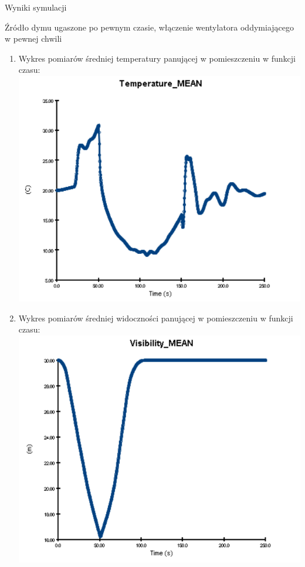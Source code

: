 \documentclass[a4paper, 12pt]{scrartcl}
\begin{document}
\begin{section}{Wyniki symulacji}
		\begin{subsection}{Źródło dymu ugaszone po pewnym czasie, włączenie wentylatora oddymiającego w pewnej chwili}
			\begin{enumerate}[i]
				\item Wykres pomiarów średniej temperatury panującej w pomieszczeniu w funkcji czasu: \\
				\includegraphics{../H24_Ventilation/temperature} \newpage
				\item Wykres pomiarów średniej widoczności panującej w pomieszczeniu w funkcji czasu:
				\includegraphics{../H24_Ventilation/visibility}
			\end{enumerate}
		\end{subsection}
		
	\end{section}
	
\end{document}

